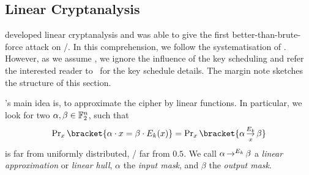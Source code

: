 \subsection{Linear Cryptanalysis}\label{sec:prelim:lc}
\textcite{EC:Matsui93} developed linear cryptanalysis and was able to give the first better-than-brute-force attack on \DES/.
In this comprehension, we follow the systematisation of \textcite[Section~2]{ToSC:KraLeaWie17}.
However, as we assume , we ignore the influence of the key scheduling and refer the interested reader to~\cite{ToSC:KraLeaWie17} for the key schedule details.
The margin note sketches the structure of this section.

\citeauthor{EC:Matsui93}'s main idea is, to approximate the cipher by linear functions.
In particular, we look for two $\alpha, \beta \in \mathbb{F}_2^n$, such that
\begin{equation}\label{eqn:linear-approx}
    \Prob_x\bracket{\iprod{\alpha}{x} = \iprod{\beta}{E_k(x)}} = \Prob_x\bracket{\propLin{\alpha}{E_k}{x}{\beta}}
\end{equation}
is far from uniformly distributed, \ie/ far from $0.5$.
We call $\alpha \operatorname*{\rightarrow}^{E_k}_{} \beta$ a \emph{linear approximation} or \emph{linear hull}, $\alpha$ the \emph{input mask}, and $\beta$ the \emph{output mask}.


